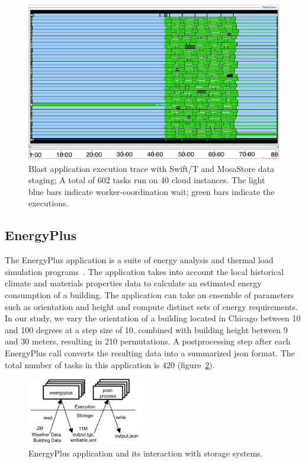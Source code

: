 \documentclass[10pt,journal,cspaper,compsoc]{IEEEtran}
\begin{document}
\begin{figure}[htb]
\begin{center}
\includegraphics[width=\linewidth]{plots/blast_timeline_40i_80c_new.png}
\caption{Blast application execution trace with Swift/T and MosaStore data
staging; A total of 602 tasks run on 40 cloud instances. The light blue
bars indicate worker-coordination wait; green bars indicate the
executions.
\label{fig_blast_t}
}
\end{center}
\end{figure}

\subsection{EnergyPlus}
The EnergyPlus application is a suite of energy analysis and thermal load
simulation programs~\cite{eplus}. The application takes into account the local
historical climate and materials properties data to calculate an estimated
energy consumption of a building. The application can
take an ensemble of parameters such as orientation and height and compute
distinct sets of energy requirements. In our study, we vary the orientation of
a building located in Chicago between 10 and 100 degrees at a step size of 10,
combined with building height between 9 and 30 meters, resulting in 210
permutations. A postprocessing step after each EnergyPlus call converts the
resulting data into a summarized json format. The total number of tasks in this
application is 420 (figure~\ref{fig_eplus}).

\begin{figure}[htb]
\begin{center}
\includegraphics[width=2in]{figures/eplus.png}
\caption{EnergyPlus application and its interaction with storage systems. 
\label{fig_eplus}
}
\end{center}
\end{figure}
\end{document}
